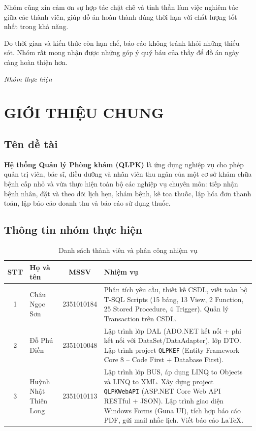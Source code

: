 \documentclass[12pt,a4paper]{report}
\begin{document}
Nhóm cũng xin cảm ơn sự hợp tác chặt chẽ và tinh thần làm việc nghiêm túc giữa các thành viên, giúp đồ án hoàn thành đúng thời hạn với chất lượng tốt nhất trong khả năng.

Do thời gian và kiến thức còn hạn chế, báo cáo không tránh khỏi những thiếu sót. Nhóm rất mong nhận được những góp ý quý báu của thầy để đồ án ngày càng hoàn thiện hơn.

\vspace{1cm}
\begin{flushright}
\textit{Nhóm thực hiện}
\end{flushright}

\tableofcontents
\listoffigures
\listoftables

\chapter{GIỚI THIỆU CHUNG}

\section{Tên đề tài}

\textbf{Hệ thống Quản lý Phòng khám (QLPK)} là ứng dụng nghiệp vụ cho phép quản trị viên, bác sĩ, điều dưỡng và nhân viên thu ngân của một cơ sở khám chữa bệnh cấp nhỏ và vừa thực hiện toàn bộ các nghiệp vụ chuyên môn: tiếp nhận bệnh nhân, đặt và theo dõi lịch hẹn, khám bệnh, kê toa thuốc, lập hóa đơn thanh toán, lập báo cáo doanh thu và báo cáo sử dụng thuốc.

\section{Thông tin nhóm thực hiện}

\begin{table}[H]
\centering
\renewcommand{\arraystretch}{1.4}
\caption{Danh sách thành viên và phân công nhiệm vụ}
\begin{tabularx}{\textwidth}{|c|l|c|X|}
\hline
\textbf{STT} & \textbf{Họ và tên} & \textbf{MSSV} & \textbf{Nhiệm vụ} \\
\hline
1 & Châu Ngọc Sơn & 2351010184 & Phân tích yêu cầu, thiết kế CSDL, viết toàn bộ T-SQL Scripts (15 bảng, 13 View, 2 Function, 25 Stored Procedure, 4 Trigger). Quản lý Transaction trên CSDL. \\
\hline
2 & Đỗ Phú Điền  & 2351010048 & Lập trình lớp DAL (ADO.NET kết nối + phi kết nối với DataSet/DataAdapter), lớp DTO. Lập trình project \texttt{QLPKEF} (Entity Framework Core 8 – Code First + Database First). \\
\hline
3 & Huỳnh Nhật Thiên Long & 2351010113 & Lập trình lớp BUS, áp dụng LINQ to Objects và LINQ to XML. Xây dựng project \texttt{QLPKWebAPI} (ASP.NET Core Web API RESTful + JSON). Lập trình giao diện Windows Forms (Guna UI), tích hợp báo cáo PDF, gửi mail nhắc lịch. Viết báo cáo LaTeX. \\
\hline
\end{tabularx}
\end{table}
\end{document}
